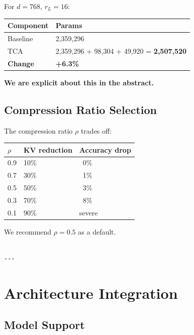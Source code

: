 For $d = 768$, $r_L = 16$:

\begin{table}[H]
\centering
\small
\begin{tabular}{ll}
\toprule
\textbf{Component} & \textbf{Params} \\
\midrule
Baseline & 2,359,296 \\
TCA & 2,359,296 + 98,304 + 49,920 = \textbf{2,507,520} \\
\textbf{Change} & \textbf{+6.3\%} \\
\bottomrule
\end{tabular}
\end{table}

\textbf{We are explicit about this in the abstract.}

\subsection{Compression Ratio Selection}

The compression ratio $\rho$ trades off:

\begin{table}[H]
\centering
\small
\begin{tabular}{lll}
\toprule
\textbf{$\rho$} & \textbf{KV reduction} & \textbf{Accuracy drop} \\
\midrule
0.9 & 10\% & ~0\% \\
0.7 & 30\% & ~1\% \\
0.5 & 50\% & ~3\% \\
0.3 & 70\% & ~8\% \\
0.1 & 90\% & severe \\
\bottomrule
\end{tabular}
\end{table}

We recommend $\rho = 0.5$ as a default.
\begin{lstlisting}

---
\end{lstlisting}

\section{Architecture Integration}

\subsection{Model Support}

